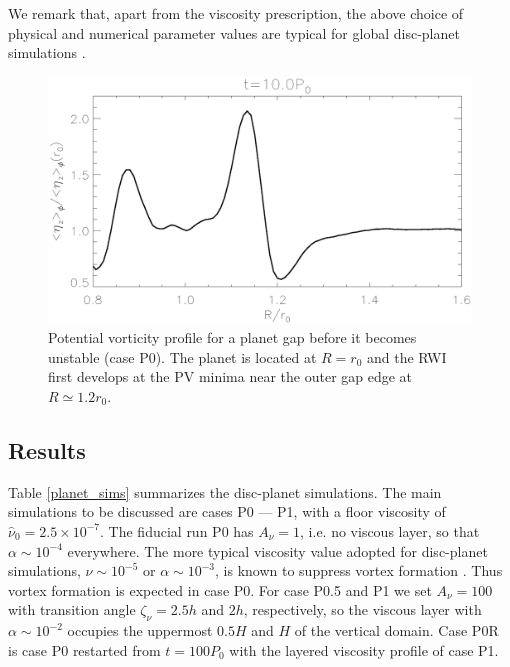 We remark that, apart from the viscosity prescription, the above
choice of physical and numerical parameter values are typical for
global disc-planet simulations \citep[e.g.][]{valborro06,mignone12}.    

\begin{figure}
  \centering
  \includegraphics[width=\linewidth]{figures/jup0_3h_vorten1d_001}
  \caption{  Potential vorticity profile for a planet gap before
    it becomes unstable (case P0). The planet is located at $R=r_0$
    and the RWI first develops at the PV minima near the outer gap edge at
    $R\simeq1.2r_0$.
    \label{planet_PV}}
\end{figure}





\subsection{Results}
Table \ref{planet_sims} summarizes the disc-planet simulations. 
The main simulations to be discussed are cases P0 --- P1, with a floor
viscosity of $\hat{\nu}_0=2.5\times10^{-7}$. 
The fiducial run P0 has $A_\nu=1$, i.e. no viscous layer, so that $\alpha\sim 10^{-4}$ everywhere. 
The more typical viscosity value adopted for disc-planet simulations,
$\hat{\nu}\sim 10^{-5}$ or $\alpha\sim 10^{-3}$, is known to suppress vortex formation
\citep{valborro07, mudryk09}. Thus vortex formation is expected in 
case P0. For case P0.5 and P1 we set $A_\nu=100$ with transition angle $\zeta_\nu=2.5h$ and
$2h$, respectively, so the viscous layer with $\alpha\sim10^{-2}$ occupies the uppermost $0.5H$ and $H$ of the vertical
domain. Case P0R is case P0 restarted from 
$t=100P_0$ with the layered viscosity profile of case P1. 
 

